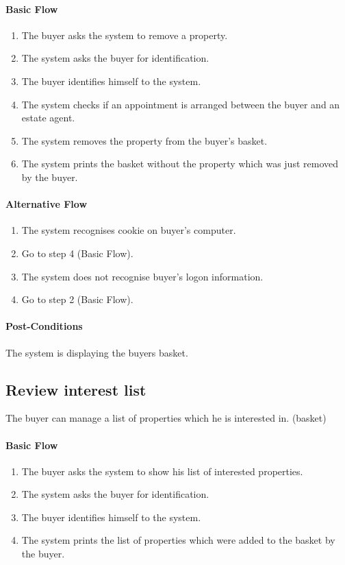 \documentclass[a4paper,12pt]{article}
\begin{document}
\paragraph{Basic Flow}
\begin{enumerate}
\item The buyer asks the system to remove a property.
\item The system asks the buyer for identification.
\item The buyer identifies himself to the system.
\item The system checks if an appointment is arranged between the buyer and an estate agent.
\item The system removes the property from the buyer's basket.
\item The system prints the basket without the property which was just removed by the buyer.
\end{enumerate}
\paragraph{Alternative Flow}
\begin{enumerate}
\item The system recognises cookie on buyer's computer.
\item Go to step 4 (Basic Flow).
\item The system does not recognise buyer's logon information.
\item Go to step 2 (Basic Flow).
\end{enumerate}
\paragraph{Post-Conditions}
The system is displaying the buyers basket.

\subsection{Review interest list}
The buyer can manage a list of properties which he is interested in. (basket)
\paragraph{Basic Flow}
\begin{enumerate}
\item The buyer asks the system to show his list of interested properties.
\item The system asks the buyer for identification.
\item The buyer identifies himself to the system.
\item The system prints the list of properties which were added to the basket by the buyer.
\end{enumerate}
\end{document}
